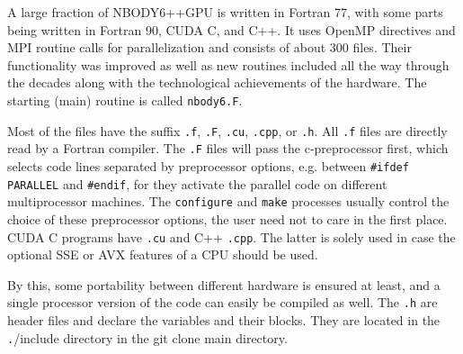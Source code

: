 


A large fraction of NBODY6++GPU is written in Fortran 77, with some parts being written in Fortran 90, CUDA C, and C++. It uses OpenMP directives and MPI routine calls for parallelization and consists of about 300
files.
Their functionality was improved as well as new routines included
all the way through the decades along with the technological
achievements of the hardware.
The starting (main) routine is called \texttt{nbody6.F}.

Most of the files have the suffix \texttt{.f}, \texttt{.F}, \texttt{.cu}, \texttt{.cpp}, or {\tt .h}.
All \texttt{.f} files are directly read by a Fortran compiler.
The \texttt{.F} files will pass the c-preprocessor first, which selects
code lines separated by preprocessor options, e.g. between
\texttt{\#ifdef PARALLEL} and \texttt{\#endif},
for they activate the parallel code on different multiprocessor
machines. The {\tt configure} and {\tt make} processes usually control the choice of these preprocessor options, the user need not to care in the first place. CUDA C programs have \texttt{.cu} and C++ \texttt{.cpp}. The latter is solely used in case the optional SSE or AVX features of a CPU should be used.

By this, some portability between different hardware is
ensured at least, and a single processor version of the code
can easily be compiled as well.
The \texttt{.h} are header files and declare the variables and
their blocks. They are located in the {\texttt ./include} directory in the git clone main directory.

